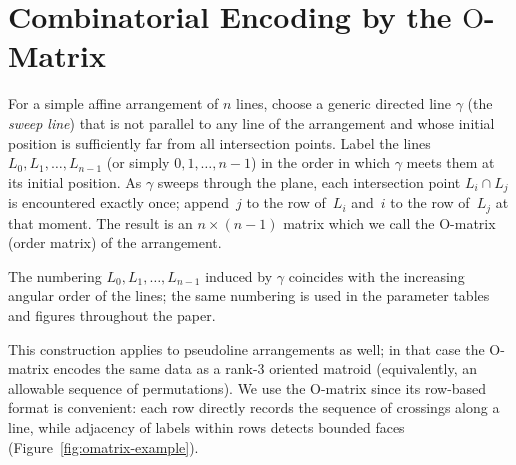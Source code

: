 \section{Combinatorial Encoding by the \texorpdfstring{$\mathrm{O}$}{O}-Matrix}\label{sec:combinatorics}

For a simple affine arrangement of $n$ lines, choose a generic directed line
$\gamma$ (the \emph{sweep line}) that is not parallel to any line of the
arrangement and whose initial position is sufficiently far from all
intersection points. Label the lines $L_0,L_1,\dots,L_{n-1}$
(or simply $0, 1, \dots, n-1$) in the order in which
$\gamma$ meets them at its initial position. As $\gamma$ sweeps
through the plane, each intersection point $L_i\cap L_j$ is encountered
exactly once; append~$j$ to the row of~$L_i$ and~$i$ to the row of~$L_j$
at that moment. The result is an $n\times(n-1)$ matrix
which we call the $\mathrm{O}$-matrix (order matrix) of the arrangement.

The numbering $L_0,L_1,\dots,L_{n-1}$ induced by $\gamma$ coincides with the
increasing angular order of the lines; the same numbering is used in the
parameter tables and figures throughout the paper.

This construction applies to pseudoline arrangements as well; in that case
the $\mathrm{O}$-matrix encodes the same data as a rank-$3$ oriented matroid
(equivalently, an allowable sequence of permutations).
We use the $\mathrm{O}$-matrix since its row-based format is convenient: each row
directly records the sequence of crossings along a line, while adjacency of
labels within rows detects bounded faces
(Figure~\ref{fig:omatrix-example}).

